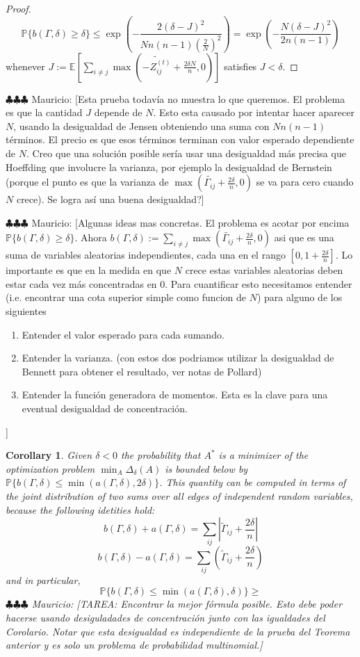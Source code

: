 \documentclass[12pt]{amsart}
\newtheorem{cor}[lemma]{Corollary}
\theoremstyle{remark}
\newcommand{\PP}{\mathbb{P}}
\newcommand{\EE}{\mathbb{E}}
\newcommand{\mv}[1]{{\color{red} \sf $\clubsuit\clubsuit\clubsuit$ Mauricio: [#1]}}
\begin{document}
\begin{proof}
\[\PP\{b(\Gamma,\delta)\geq \delta\}\leq \exp\left( -\frac{2(\delta-J)^2}{Nn(n-1)\left(\frac{2}{N}\right)^2}\right)=\exp\left(-\frac{N(\delta-J)^2}{2n(n-1)}\right)\]
whenever $J:=\EE\left[\sum_{i\neq j}\max\left(\widetilde{-Z_{ij}^{(t)}}+\frac{2\delta N}{n},0\right)\right]$ satisfies $J<\delta$.
\end{proof}

\mv{Esta prueba todav\'ia no muestra lo que queremos. El problema es que la cantidad $J$ depende de $N$. Esto esta causado por intentar hacer aparecer $N$, usando la desigualdad de Jensen obteniendo una suma con $Nn(n-1)$ t\'erminos. El precio es que esos t\'erminos terminan con valor esperado dependiente de $N$. Creo que una soluci\'on posible ser\'ia usar una desigualdad m\'as precisa que Hoeffding que involucre la varianza, por ejemplo la desigualdad de Bernstein (porque el punto es que la varianza de $\max(\widetilde{\Gamma_{ij}}+\frac{2\delta}{n},0)$ se va para cero cuando $N$ crece). Se logra as\'i una buena desigualdad?} 

\mv{Algunas ideas mas concretas. El problema es acotar por encima $\PP\{b(\Gamma,\delta)\geq \delta\}$. Ahora $b(\Gamma,\delta):=\sum_{i\neq j} \max\left(\widetilde{\Gamma_{ij}}+\frac{2\delta}{n},0\right)$ asi que es una suma de variables aleatorias independientes, cada una en el rango $[0, 1+ \frac{2\delta}{n}]$. Lo importante es que en la medida en que $N$ crece estas variables aleatorias deben estar cada vez m\'as concentradas en $0$. Para cuantificar esto necesitamos entender (i.e. encontrar una cota superior simple como funcion de $N$) para alguno de los siguientes 
\begin{enumerate}
\item Entender el valor esperado para cada sumando.
\item Entender la varianza. (con estos dos podriamos utilizar la desigualdad de Bennett para obtener el resultado, ver notas de Pollard) 
\item Entender la funci\'on generadora de momentos. Esta es la clave para una eventual desigualdad de concentraci\'on.
\end{enumerate}
}



\begin{cor} Given $\delta<0$ the probability that $A^*$ is a minimizer of the optimization problem $\min_A\Delta_{\delta}(A)$ is bounded below by $\mathbb{P}\{ b(\Gamma,\delta)\leq \min \left(a(\Gamma,\delta), 2\delta\right)\}$.  
This quantity can be computed in terms of the joint distribution of two sums over all edges of independent random variables, because the following idetities hold:
\[b(\Gamma,\delta)+a(\Gamma,\delta)=\sum_{ij} \left|\widetilde{\Gamma}_{ij}+\frac{2\delta}{n}\right|\]
\[b(\Gamma,\delta)-a(\Gamma,\delta)=\sum_{ij} \left(\widetilde{\Gamma}_{ij}+\frac{2\delta}{n}\right)\]
and in particular, 
\[\mathbb{P}\{ b(\Gamma,\delta)\leq \min \left(a(\Gamma,\delta), \delta\right)\}\geq \]  
\mv{TAREA: Encontrar la mejor f\'ormula posible. Esto debe poder hacerse usando desiguladades de concentraci\'on junto con las igualdades del Corolario. Notar que esta desigualdad es independiente de la prueba del Teorema anterior y es solo un problema de probabilidad multinomial.}
\end{cor}
\end{document}
